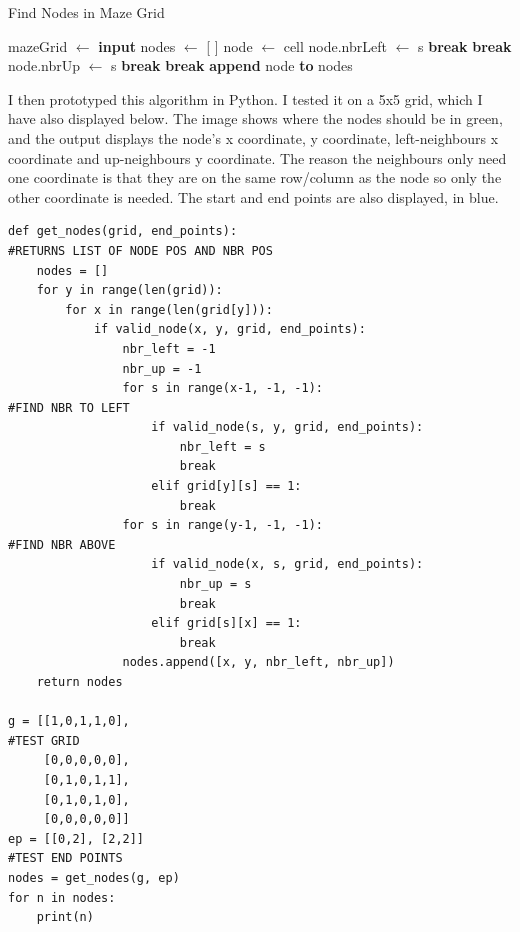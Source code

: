 \documentclass[titlepage]{article}
\begin{document}
\begin{algorithm}[H]
\caption{Find Nodes in Maze Grid}
\begin{algorithmic}[1]
    	\State mazeGrid $\gets$ \textbf{input}
    	\State nodes $\gets$ [ ]
			\State node $\gets$ cell
					\State node.nbrLeft $\gets$ s
					\State \textbf{break}
					\State \textbf{break}
				\EndIf
			\EndFor
					\State node.nbrUp $\gets$ s
					\State \textbf{break}
					\State \textbf{break}
				\EndIf
			\EndFor
			\State \textbf{append} node \textbf{to} nodes
		\EndIf
	\EndFor
\end{algorithmic}
\end{algorithm}

I then prototyped this algorithm in Python. I tested it on a 5x5 grid, which I have also displayed below. The image shows where the nodes should be in green, and the output displays the node's x coordinate, y coordinate, left-neighbours x coordinate and up-neighbours y coordinate. The reason the neighbours only need one coordinate is that they are on the same row/column as the node so only the other coordinate is needed. The start and end points are also displayed, in blue. 

\begin{changemargin}{-1in}{-1in} 
\begin{verbatim}
def get_nodes(grid, end_points):                                                #RETURNS LIST OF NODE POS AND NBR POS
    nodes = []
    for y in range(len(grid)):
        for x in range(len(grid[y])):
            if valid_node(x, y, grid, end_points):
                nbr_left = -1
                nbr_up = -1
                for s in range(x-1, -1, -1):                                    #FIND NBR TO LEFT
                    if valid_node(s, y, grid, end_points):
                        nbr_left = s
                        break
                    elif grid[y][s] == 1:
                        break
                for s in range(y-1, -1, -1):                                    #FIND NBR ABOVE
                    if valid_node(x, s, grid, end_points):
                        nbr_up = s
                        break
                    elif grid[s][x] == 1:
                        break
                nodes.append([x, y, nbr_left, nbr_up])
    return nodes

g = [[1,0,1,1,0],                                                               #TEST GRID
     [0,0,0,0,0],
     [0,1,0,1,1],
     [0,1,0,1,0],
     [0,0,0,0,0]]
ep = [[0,2], [2,2]]                                                             #TEST END POINTS
nodes = get_nodes(g, ep)
for n in nodes:
    print(n)
\end{verbatim}
\end{changemargin} 
\end{document}
